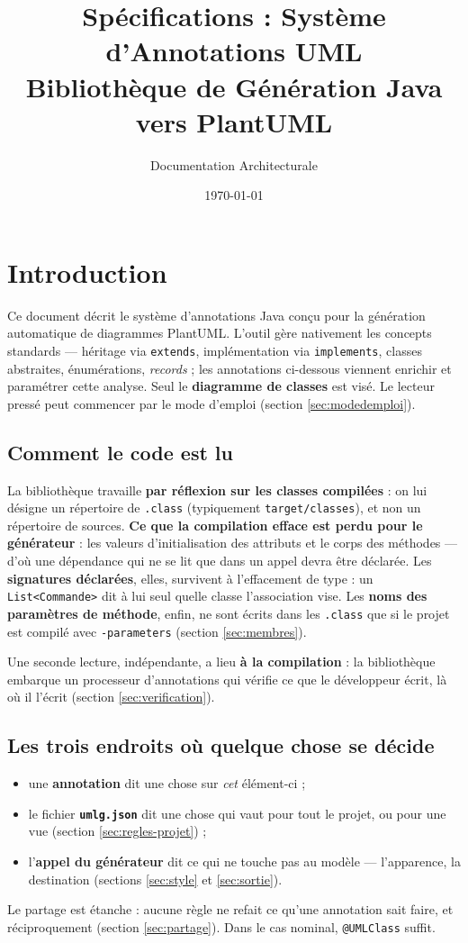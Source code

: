 \documentclass[12pt, a4paper]{article}
\title{\textbf{Spécifications : Système d'Annotations UML} \\ \large Bibliothèque de Génération Java vers PlantUML}
\author{Documentation Architecturale}
\date{\today}
\begin{document}
\maketitle
\vspace{-1.5em}
\tableofcontents
\vspace{1em}

\section{Introduction}
Ce document décrit le système d'annotations Java conçu pour la génération automatique de diagrammes PlantUML. L'outil gère nativement les concepts standards --- héritage via \texttt{extends}, implémentation via \texttt{implements}, classes abstraites, énumérations, \textit{records} ; les annotations ci-dessous viennent enrichir et paramétrer cette analyse. Seul le \textbf{diagramme de classes} est visé. Le lecteur pressé peut commencer par le mode d'emploi (section \ref{sec:modedemploi}).

\subsection{Comment le code est lu}
\label{sec:lecture}

La bibliothèque travaille \textbf{par réflexion sur les classes compilées} : on lui désigne un répertoire de \texttt{.class} (typiquement \texttt{target/classes}), et non un répertoire de sources. \textbf{Ce que la compilation efface est perdu pour le générateur} : les valeurs d'initialisation des attributs et le corps des méthodes --- d'où une dépendance qui ne se lit que dans un appel devra être déclarée. Les \textbf{signatures déclarées}, elles, survivent à l'effacement de type : un \texttt{List<Commande>} dit à lui seul quelle classe l'association vise. Les \textbf{noms des paramètres de méthode}, enfin, ne sont écrits dans les \texttt{.class} que si le projet est compilé avec \texttt{-parameters} (section \ref{sec:membres}).

Une seconde lecture, indépendante, a lieu \textbf{à la compilation} : la bibliothèque embarque un processeur d'annotations qui vérifie ce que le développeur écrit, là où il l'écrit (section \ref{sec:verification}).

\subsection{Les trois endroits où quelque chose se décide}
\begin{itemize}
    \item une \textbf{annotation} dit une chose sur \textit{cet} élément-ci ;
    \item le fichier \textbf{\texttt{umlg.json}} dit une chose qui vaut pour tout le projet, ou pour une vue (section \ref{sec:regles-projet}) ;
    \item l'\textbf{appel du générateur} dit ce qui ne touche pas au modèle --- l'apparence, la destination (sections \ref{sec:style} et \ref{sec:sortie}).
\end{itemize}
Le partage est étanche : aucune règle ne refait ce qu'une annotation sait faire, et réciproquement (section \ref{sec:partage}). Dans le cas nominal, \texttt{@UMLClass} suffit.
\end{document}
